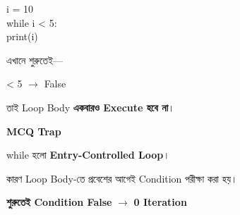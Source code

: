 

\begin{codebox}
\begin{english}
\ttfamily
i = 10\\[0.5mm]
while i < 5:\\
\hspace*{4mm}print(i)
\end{english}
\end{codebox}

এখানে শুরুতেই—

\begin{center}

\textenglish{ < 5}
\(\longrightarrow\)
\textenglish{\ttfamily False}

\end{center}

তাই Loop Body
\textbf{একবারও Execute হবে না}।

\begin{rememberbox}

\textbf{\color{deepOrange}MCQ Trap}

\textenglish{\ttfamily while}
হলো \textbf{Entry-Controlled Loop}।

কারণ Loop Body-তে প্রবেশের আগেই Condition পরীক্ষা করা হয়।

\begin{center}

\textbf{শুরুতেই Condition False}
\(\longrightarrow\)
\textbf{0 Iteration}

\end{center}

\end{rememberbox}



